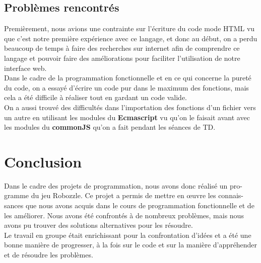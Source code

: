 \documentclass[11pt]{article}
\begin{document}
\subsection{Problèmes rencontrés}
Premièrement, nous avions une contrainte sur l'écriture du code mode HTML vu que c'est notre première expérience avec ce langage, et donc au début, on a perdu beaucoup de temps à faire des recherches sur internet afin de comprendre ce langage et pouvoir faire des améliorations pour faciliter l'utilisation de notre interface web. \\
Dans le cadre de la programmation fonctionnelle et en ce qui concerne la pureté du code, on a essayé d'écrire un code pur dans le maximum des fonctions, mais cela a été difficile à réaliser tout en gardant un code valide.\\
On a aussi trouvé des difficultés dans l'importation des fonctions d'un fichier vers un autre en utilisant les modules du \textbf{Ecmascript} vu qu'on le faisait avant avec les modules du \textbf{commonJS} qu'on a fait pendant les séances de TD.\\

\section{Conclusion}
Dans le cadre des projets de programmation, nous avons donc réalisé un pro-
gramme du jeu Robozzle. Ce projet a permis de mettre en œuvre les connais-
sances que nous avons acquis dans le cours de programmation fonctionnelle et de les améliorer. Nous avons été confrontés à de nombreux problèmes, mais nous avons pu
trouver des solutions alternatives pour les résoudre.\\
Le travail en groupe était enrichissant pour la confrontation d’idées et a été une bonne manière de progresser, à la fois sur le code et sur la manière d’appréhender et de résoudre les problèmes.
\end{document}
